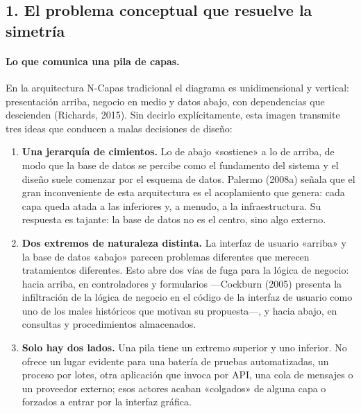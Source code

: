 \documentclass[11pt,a4paper]{article}
\begin{document}
\subsection*{1. El problema conceptual que resuelve la simetría}

\paragraph{Lo que comunica una pila de capas.}
En la arquitectura N-Capas tradicional el diagrama es unidimensional y vertical:
presentación arriba, negocio en medio y datos abajo, con dependencias que descienden
(Richards, 2015). Sin decirlo explícitamente, esta imagen transmite tres ideas que conducen a
malas decisiones de diseño:

\begin{enumerate}[leftmargin=1.4em]
\item \textbf{Una jerarquía de cimientos.} Lo de abajo «sostiene» a lo de arriba, de modo que
la base de datos se percibe como el fundamento del sistema y el diseño suele comenzar por el
esquema de datos. Palermo (2008a) señala que el gran inconveniente de esta arquitectura es el
acoplamiento que genera: cada capa queda atada a las inferiores y, a menudo, a la
infraestructura. Su respuesta es tajante: la base de datos no es el centro, sino algo externo.
\item \textbf{Dos extremos de naturaleza distinta.} La interfaz de usuario «arriba» y la base
de datos «abajo» parecen problemas diferentes que merecen tratamientos diferentes. Esto abre
dos vías de fuga para la lógica de negocio: hacia arriba, en controladores y formularios
---Cockburn (2005) presenta la infiltración de la lógica de negocio en el código de la
interfaz de usuario como uno de los males históricos que motivan su propuesta---, y hacia
abajo, en consultas y procedimientos almacenados.
\item \textbf{Solo hay dos lados.} Una pila tiene un extremo superior y uno inferior. No
ofrece un lugar evidente para una batería de pruebas automatizadas, un proceso por lotes,
otra aplicación que invoca por API, una cola de mensajes o un proveedor externo; esos actores
acaban «colgados» de alguna capa o forzados a entrar por la interfaz gráfica.
\end{enumerate}
\end{document}
